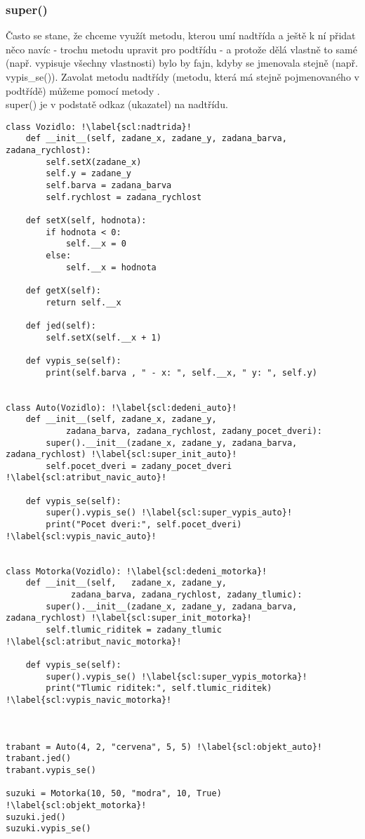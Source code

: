 \vspace{.5cm}
\subsubsection{super()}
Často se stane, že chceme využít metodu, kterou umí nadtřída a ještě k ní přidat něco navíc - trochu metodu upravit pro podtřídu - a protože dělá vlastně to samé (např. vypisuje všechny vlastnosti) bylo by fajn, kdyby se jmenovala stejně (např. vypis\_se()). Zavolat metodu nadtřídy (metodu, která má stejně pojmenovaného  v podtřídě) můžeme pomocí metody .\\
super() je v podstatě odkaz (ukazatel) na nadtřídu.

\begin{minipage}[t]{.45\textwidth}
\begin{code}
\begin{verbatim}
class Vozidlo: !\label{scl:nadtrida}!
	def __init__(self, zadane_x, zadane_y, zadana_barva, zadana_rychlost):
		self.setX(zadane_x) 		
		self.y = zadane_y
		self.barva = zadana_barva
		self.rychlost = zadana_rychlost
	
	def setX(self, hodnota): 
		if hodnota < 0: 
			self.__x = 0
		else:
			self.__x = hodnota
			
	def getX(self):
		return self.__x
	
	def jed(self):
		self.setX(self.__x + 1)
		
	def vypis_se(self):
		print(self.barva , " - x: ", self.__x, " y: ", self.y)


class Auto(Vozidlo): !\label{scl:dedeni_auto}!
	def __init__(self, zadane_x, zadane_y,
	 		zadana_barva, zadana_rychlost, zadany_pocet_dveri):
		super().__init__(zadane_x, zadane_y, zadana_barva, zadana_rychlost) !\label{scl:super_init_auto}!
		self.pocet_dveri = zadany_pocet_dveri !\label{scl:atribut_navic_auto}!
		
	def vypis_se(self):
		super().vypis_se() !\label{scl:super_vypis_auto}!
		print("Pocet dveri:", self.pocet_dveri) !\label{scl:vypis_navic_auto}!
		
		
class Motorka(Vozidlo): !\label{scl:dedeni_motorka}!
	def __init__(self,   zadane_x, zadane_y,
			 zadana_barva, zadana_rychlost, zadany_tlumic):
		super().__init__(zadane_x, zadane_y, zadana_barva, zadana_rychlost) !\label{scl:super_init_motorka}!
		self.tlumic_riditek = zadany_tlumic !\label{scl:atribut_navic_motorka}!
		
	def vypis_se(self):
		super().vypis_se() !\label{scl:super_vypis_motorka}!
		print("Tlumic riditek:", self.tlumic_riditek) !\label{scl:vypis_navic_motorka}!
 	
	
		
trabant = Auto(4, 2, "cervena", 5, 5) !\label{scl:objekt_auto}!
trabant.jed()
trabant.vypis_se()

suzuki = Motorka(10, 50, "modra", 10, True) !\label{scl:objekt_motorka}!
suzuki.jed()
suzuki.vypis_se()

\end{verbatim}

\label{code:dedicnost}
\end{code}
\end{minipage}
